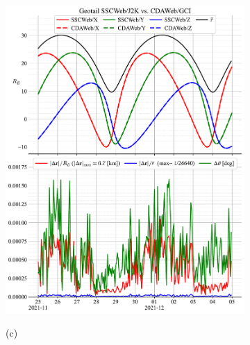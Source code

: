 \documentclass[draft]{agujournal2019}
\begin{document}
\begin{figure}[h]
\begin{subfigure}[b]{0.49\textwidth}
         \includegraphics[width=\textwidth]{code/figures/ephemeris/Geotail_SSCWeb-J2K_vs_CDAWeb-GCI.pdf}
     \end{subfigure}
     \par\bigskip\bigskip
     \begin{subfigure}[b]{0.49\textwidth}
         (c)
         \centering

\end{subfigure}
\end{figure}
\end{document}
